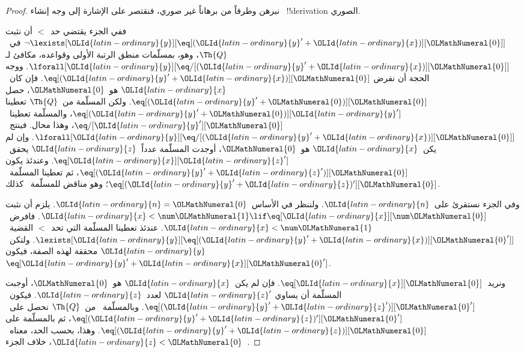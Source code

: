 \documentclass[../../../include/open-logic-section]{subfiles}
\begin{document}
\begin{proof}
نبرهن  وطرفاً من  برهاناً غير صوري، فنقتصر على الإشارة إلى وجه إنشاء
~!!{derivation} الصوري.

ففي الجزء  يقتضي حد~$<$ أن نثبت
$\lnot \lexists[\OLId{latin-ordinary}{y}][\eq[(\OLId{latin-ordinary}{y}'+\OLId{latin-ordinary}{x})][\OLMathNumeral{0}]]$ في~$\Th{Q}$، وهو، بمسلّمات منطق
الرتبة الأولى وقواعده، مكافئ لـ
$\lforall[\OLId{latin-ordinary}{y}][\eq/[(\OLId{latin-ordinary}{y}' + \OLId{latin-ordinary}{x})][\OLMathNumeral{0}]]$. ووجه الحجة أن نفرض
$\eq[(\OLId{latin-ordinary}{y}'+\OLId{latin-ordinary}{x})][\OLMathNumeral{0}]$. فإن كان~$\OLId{latin-ordinary}{x}$ هو~$\OLMathNumeral{0}$، حصل
$\eq[(\OLId{latin-ordinary}{y}' + \OLMathNumeral{0})][\OLMathNumeral{0}]$. ولكن المسلّمة  من~$\Th{Q}$ تعطينا
$\eq[(\OLId{latin-ordinary}{y}' + \OLMathNumeral{0})][\OLId{latin-ordinary}{y}']$، والمسلّمة  تعطينا~$\eq/[\OLId{latin-ordinary}{y}'][\OLMathNumeral{0}]$، وهذا محال.
فينتج~$\lforall[\OLId{latin-ordinary}{y}][\eq/[(\OLId{latin-ordinary}{y}' +\OLId{latin-ordinary}{x})][\OLMathNumeral{0}]]$. وإن لم يكن~$\OLId{latin-ordinary}{x}$ هو~$\OLMathNumeral{0}$، أوجدت
المسلّمة  عدداً~$\OLId{latin-ordinary}{z}$ يحقق~$\eq[\OLId{latin-ordinary}{x}][\OLId{latin-ordinary}{z}']$. وعندئذ يكون
$\eq[(\OLId{latin-ordinary}{y}' + \OLId{latin-ordinary}{z}')][\OLMathNumeral{0}]$، ثم تعطينا المسلّمة~
$\eq[(\OLId{latin-ordinary}{y}' + \OLId{latin-ordinary}{z})'][\OLMathNumeral{0}]$؛ وهو مناقض للمسلّمة~ كذلك.

وفي الجزء  نستقرئ على~$\OLId{latin-ordinary}{n}$. ولننظر في الأساس~$\OLId{latin-ordinary}{n} =\OLMathNumeral{0}$. يلزم أن نثبت
$\OLId{latin-ordinary}{x} < \num \OLMathNumeral{1} \lif \eq[\OLId{latin-ordinary}{x}][\num \OLMathNumeral{0}]$. فافرض~$\OLId{latin-ordinary}{x} < \num \OLMathNumeral{1}$. عندئذ تعطينا
المسلّمة التي تحد~$<$ القضية~$\lexists[\OLId{latin-ordinary}{y}][\eq[(\OLId{latin-ordinary}{y}'+\OLId{latin-ordinary}{x})][\OLMathNumeral{0}']]$. ولتكن~$\OLId{latin-ordinary}{y}$
محققة لهذه الصفة، فيكون~$\eq[\OLId{latin-ordinary}{y}'+\OLId{latin-ordinary}{x}][\OLMathNumeral{0}']$.

ونريد~$\eq[\OLId{latin-ordinary}{x}][\OLMathNumeral{0}]$. فإن لم يكن~$\OLId{latin-ordinary}{x}$ هو~$\OLMathNumeral{0}$، أوجبت المسلّمة  أن يساوي
$\OLId{latin-ordinary}{z}'$ لعدد~$\OLId{latin-ordinary}{z}$. فيكون~$\eq[(\OLId{latin-ordinary}{y}' + \OLId{latin-ordinary}{z}')][\OLMathNumeral{0}']$. وبالمسلّمة~ من~$\Th{Q}$
نحصل على~$\eq[(\OLId{latin-ordinary}{y}'+\OLId{latin-ordinary}{z})'][\OLMathNumeral{0}']$، ثم بالمسلّمة  على
$\eq[(\OLId{latin-ordinary}{y}' + \OLId{latin-ordinary}{z})][\OLMathNumeral{0}]$. وهذا، بحسب الحد، معناه~$\OLId{latin-ordinary}{z} < \OLMathNumeral{0}$، خلاف الجزء~.
\end{proof}
\end{document}
